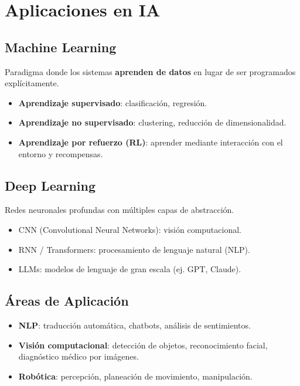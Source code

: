 \section{Aplicaciones en IA}

\subsection{Machine Learning}

Paradigma donde los sistemas \textbf{aprenden de datos} en lugar de ser programados explícitamente.

\begin{itemize}
    \item \textbf{Aprendizaje supervisado}: clasificación, regresión.
    \item \textbf{Aprendizaje no supervisado}: clustering, reducción de dimensionalidad.
    \item \textbf{Aprendizaje por refuerzo (RL)}: aprender mediante interacción con el entorno y recompensas.
\end{itemize}

\subsection{Deep Learning}

Redes neuronales profundas con múltiples capas de abstracción.
\begin{itemize}
    \item CNN (Convolutional Neural Networks): visión computacional.
    \item RNN / Transformers: procesamiento de lenguaje natural (NLP).
    \item LLMs: modelos de lenguaje de gran escala (ej. GPT, Claude).
\end{itemize}

\subsection{Áreas de Aplicación}

\begin{itemize}
    \item \textbf{NLP}: traducción automática, chatbots, análisis de sentimientos.
    \item \textbf{Visión computacional}: detección de objetos, reconocimiento facial, diagnóstico médico por imágenes.
    \item \textbf{Robótica}: percepción, planeación de movimiento, manipulación.
\end{itemize}

